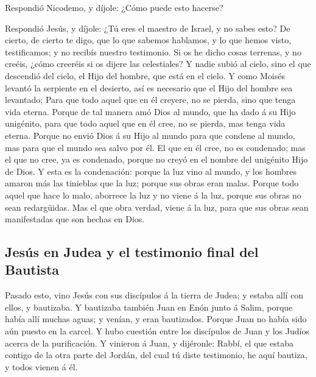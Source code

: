  Respondió Nicodemo, y díjole: ¿Cómo puede esto hacerse?

 Respondió Jesús, y díjole: ¿Tú eres el maestro de Israel,
y no sabes esto?  De cierto, de cierto te digo, que lo que
sabemos hablamos, y lo que hemos visto, testificamos; y no recibís
nuestro testimonio.  Si os he dicho cosas terrenas, y no
creéis, ¿cómo creeréis si os dijere las celestiales?  Y
nadie subió al cielo, sino el que descendió del cielo, el Hijo del
hombre, que está en el cielo.  Y como Moisés levantó la
serpiente en el desierto, así es necesario que el Hijo del hombre sea
levantado;  Para que todo aquel que en él creyere, no se
pierda, sino que tenga vida eterna.  Porque de tal manera
amó Dios al mundo, que ha dado á su Hijo unigénito, para que todo aquel
que en él cree, no se pierda, mas tenga vida eterna. 
Porque no envió Dios á su Hijo al mundo para que condene al mundo, mas
para que el mundo sea salvo por él.  El que en él cree, no
es condenado; mas el que no cree, ya es condenado, porque no creyó en el
nombre del unigénito Hijo de Dios.  Y esta es la
condenación: porque la luz vino al mundo, y los hombres amaron más las
tinieblas que la luz; porque sus obras eran malas.  Porque
todo aquel que hace lo malo, aborrece la luz y no viene á la luz, porque
sus obras no sean redargüidas.  Mas el que obra verdad,
viene á la luz, para que sus obras sean manifestadas que son hechas en
Dios.

\hypertarget{jesuxfas-en-judea-y-el-testimonio-final-del-bautista}{%
\subsection{Jesús en Judea y el testimonio final del
Bautista}\label{jesuxfas-en-judea-y-el-testimonio-final-del-bautista}}

 Pasado esto, vino Jesús con sus discípulos á la tierra de
Judea; y estaba allí con ellos, y bautizaba.  Y bautizaba
también Juan en Enón junto á Salim, porque había allí muchas aguas; y
venían, y eran bautizados.  Porque Juan no había sido aún
puesto en la carcel.  Y hubo cuestión entre los discípulos
de Juan y los Judíos acerca de la purificación.  Y vinieron
á Juan, y dijéronle: Rabbí, el que estaba contigo de la otra parte del
Jordán, del cual tú diste testimonio, he aquí bautiza, y todos vienen á
él.

